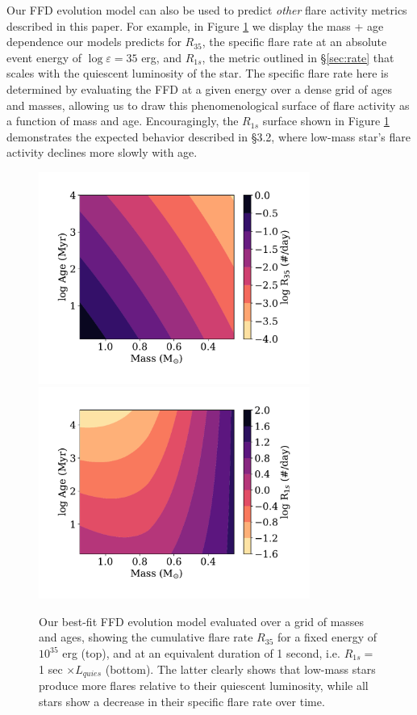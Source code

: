 \documentclass[preprint2]{aastex62}
\begin{document}
Our FFD evolution model can also be used to predict {\it other} flare activity metrics described in this paper. For example, in Figure \ref{fig:grid} we display the mass + age dependence our models predicts for $R_{35}$, the specific flare rate at an absolute event energy of $\log \varepsilon = 35$ erg, and $R_{1s}$, the metric outlined in \S\ref{sec:rate} that scales with the quiescent luminosity of the star. The specific flare rate here is determined by evaluating the FFD at a given energy over a dense grid of ages and masses, allowing us to draw this phenomenological surface of flare activity as a function of mass and age. 
Encouragingly, the $R_{1s}$ surface shown in Figure \ref{fig:grid} demonstrates the expected behavior described in \S3.2, where low-mass star's flare activity declines more slowly with age.


\begin{figure}[!t]
\centering
\includegraphics[width=3.5in]{fig11a}
\includegraphics[width=3.5in]{fig11b}
\caption{
Our best-fit FFD evolution model evaluated over a grid of masses and ages, showing the cumulative flare rate $R_{35}$ for a fixed energy of $10^35$ erg (top), and at an equivalent duration of 1 second, i.e. $R_{1s} = $ 1 sec $\times L_{quies}$ (bottom). The latter clearly shows that low-mass stars produce more flares relative to their quiescent luminosity, while all stars show a decrease in their specific flare rate over time.
}
\label{fig:grid}
\end{figure}
\end{document}
